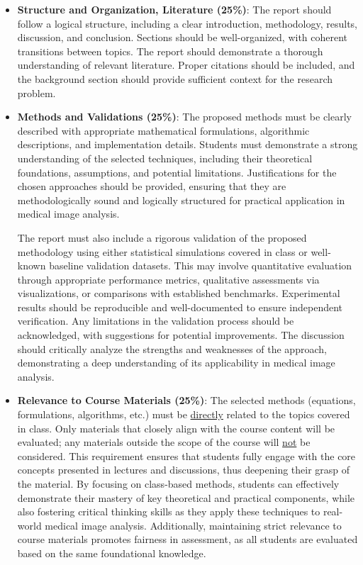 \documentclass[12pt,portrait]{article}
\begin{document}
\begin{itemize}
    \item \textbf{Structure and Organization, Literature  (25\%)}: The report should follow a logical structure, including a clear introduction, methodology, results, discussion, and conclusion. Sections should be well-organized, with coherent transitions between topics.  The report should demonstrate a thorough understanding of relevant literature. Proper citations should be included, and the background section should provide sufficient context for the research problem.
    

\item \textbf{Methods and Validations (25\%)}: The proposed methods must be clearly described with appropriate mathematical formulations, algorithmic descriptions, and implementation details. Students must demonstrate a strong understanding of the selected techniques, including their theoretical foundations, assumptions, and potential limitations. Justifications for the chosen approaches should be provided, ensuring that they are methodologically sound and logically structured for practical application in medical image analysis. 

The report must also include a rigorous validation of the proposed methodology using either statistical simulations covered in class or well-known baseline validation datasets. This may involve quantitative evaluation through appropriate performance metrics, qualitative assessments via visualizations, or comparisons with established benchmarks. Experimental results should be reproducible and well-documented to ensure independent verification. Any limitations in the validation process should be acknowledged, with suggestions for potential improvements. The discussion should critically analyze the strengths and weaknesses of the approach, demonstrating a deep understanding of its applicability in medical image analysis.


\item \textbf{Relevance to Course Materials (25\%)}: The selected methods (equations, formulations, algorithms, etc.) must be \underline{directly} related to the topics covered in class. Only materials that closely align with the course content will be evaluated; any materials outside the scope of the course will \underline{not} be considered. This requirement ensures that students fully engage with the core concepts presented in lectures and discussions, thus deepening their grasp of the material. By focusing on class-based methods, students can effectively demonstrate their mastery of key theoretical and practical components, while also fostering critical thinking skills as they apply these techniques to real-world medical image analysis. Additionally, maintaining strict relevance to course materials promotes fairness in assessment, as all students are evaluated based on the same foundational knowledge. 



\end{itemize}
\end{document}
